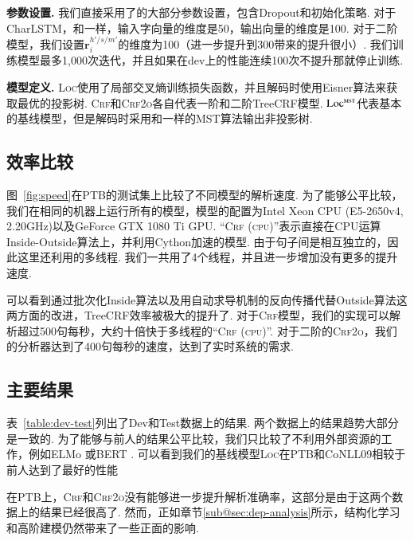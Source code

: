 

\noindent\textbf{参数设置.}
我们直接采用了\citet{dozat-etal-2017-biaffine}的大部分参数设置，包含Dropout和初始化策略.
对于CharLSTM，和\citet{lample-etal-2016-neural}一样，输入字向量的维度是50，输出向量的维度是100.
对于二阶模型，我们设置$\mathbf{r}^{h'/s/m'}_i$的维度为100（进一步提升到300带来的提升很小）.
我们训练模型最多1,000次迭代，并且如果在dev上的性能连续100次不提升那就停止训练.

\noindent\textbf{模型定义.}
\textsc{Loc}使用了局部交叉熵训练损失函数，并且解码时使用Eisner算法来获取最优的投影树.
\textsc{Crf}和\textsc{Crf2o}各自代表一阶和二阶TreeCRF模型.
$\textsc{Loc}^{\textsc{mst}}$代表基本的基线模型，但是解码时采用和\citet{dozat-etal-2017-biaffine}一样的MST算法输出非投影树.

\subsection{效率比较}

图~\ref{fig:speed}在PTB的测试集上比较了不同模型的解析速度.
为了能够公平比较，我们在相同的机器上运行所有的模型，模型的配置为Intel Xeon CPU (E5-2650v4, 2.20GHz)以及GeForce GTX 1080 Ti GPU.
``\textsc{Crf (cpu)}''表示直接在CPU运算Inside-Outside算法上，并利用Cython加速的模型.
由于句子间是相互独立的，因此这里还利用的多线程.
我们一共用了4个线程，并且进一步增加没有更多的提升速度.

可以看到通过批次化Inside算法以及用自动求导机制的反向传播代替Outside算法这两方面的改进，TreeCRF效率被极大的提升了.
对于\textsc{Crf}模型，我们的实现可以解析超过500句每秒，大约十倍快于多线程的``\textsc{Crf (cpu)}''.
对于二阶的\textsc{Crf2o}，我们的分析器达到了400句每秒的速度，达到了实时系统的需求.

\subsection{主要结果}

表~\ref{table:dev-test}列出了Dev和Test数据上的结果.
两个数据上的结果趋势大部分是一致的.
为了能够与前人的结果公平比较，我们只比较了不利用外部资源的工作，例如ELMo \citep{peters-etal-2018-deep}或BERT \citep{devlin-etal-2019-bert}.
可以看到我们的基线模型\textsc{Loc}在PTB和CoNLL09相较于前人达到了最好的性能

在PTB上，\textsc{Crf}和\textsc{Crf2o}没有能够进一步提升解析准确率，这部分是由于这两个数据上的结果已经很高了.
然而，正如章节\ref{sub@sec:dep-analysis}所示，结构化学习和高阶建模仍然带来了一些正面的影响.

